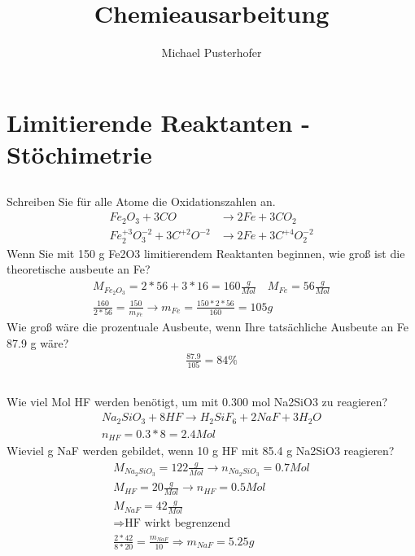 \documentclass[a4paper]{article}
\newcommand{\gpm}{\frac{g}{Mol}}
\begin{document}
\author{Michael Pusterhofer}
\title{Chemieausarbeitung}
\maketitle
\newpage
\section{Limitierende Reaktanten - Stöchimetrie}
\subsection{}
Schreiben Sie für alle Atome die Oxidationszahlen an.
\begin{align}
  Fe_2O_3 + 3 CO &\rightarrow 2Fe + 3CO_2\\
  Fe_2^{+3}O_3^{-2} + 3 C^{+2}O^{-2} &\rightarrow 2Fe + 3C^{+4}O_2^{-2}
\end{align}
Wenn Sie mit 150 g Fe2O3 limitierendem Reaktanten
beginnen, wie groß ist die theoretische ausbeute an Fe?
\begin{align}
  M_{Fe_2O_3}=2*56+3*16=160 \gpm \quad M_{Fe}=56\gpm \\
  \frac{160}{2*56}=\frac{150}{m_{Fe}} \rightarrow m_{Fe}=\frac{150 * 2 * 56}{160}=105g
\end{align}
Wie groß wäre die prozentuale Ausbeute, wenn Ihre
tatsächliche Ausbeute an Fe 87.9 g wäre?
\begin{align}
  \frac{87.9}{105}=84\%
\end{align}

\subsection{}
Wie viel Mol HF werden benötigt, um mit 0.300 mol Na2SiO3 zu reagieren?
\begin{align}
  Na_2SiO_3 + 8 HF \rightarrow H_2SiF_6 + 2 NaF +3 H_2O\\
  n_{HF}=0.3*8=2.4 Mol
\end{align}
Wieviel g NaF werden gebildet, wenn 10 g HF mit 85.4 g Na2SiO3 reagieren?
\begin{align}
  M_{Na_2SiO_3}=122\gpm \rightarrow n_{Na_2SiO_3}=0.7 Mol\\
  M_{HF}=20\gpm \rightarrow n_{HF}=0.5 Mol\\
  M_{NaF}=42\gpm \\
  \Rightarrow \text{HF wirkt begrenzend}\\
  \frac{2*42}{8*20}=\frac{m_{NaF}}{10} \Rightarrow m_{NaF}=5.25g
\end{align}
\end{document}
